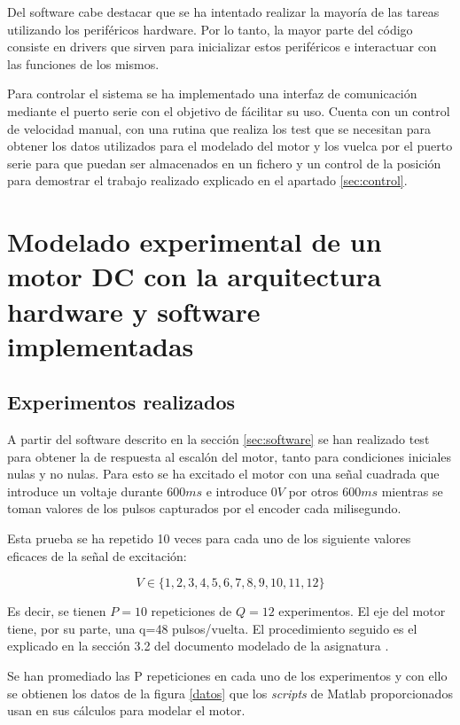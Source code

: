 \documentclass[a4paper]{article}
\begin{document}
Del software cabe destacar que se ha intentado realizar la mayoría de las tareas utilizando los periféricos hardware. Por lo tanto,
la mayor parte del código consiste en drivers que sirven para inicializar estos periféricos e interactuar con las funciones de los mismos.

Para controlar el sistema se ha implementado una interfaz de comunicación mediante el puerto serie con el objetivo de fácilitar su uso.
Cuenta con un control de velocidad manual, con una rutina que realiza los test que se necesitan para obtener los datos utilizados para el modelado del motor y los vuelca
por el puerto serie para que puedan ser almacenados en un fichero y un control de la posición para demostrar el trabajo realizado explicado en el apartado \ref{sec:control}.

\section{Modelado experimental de un motor DC con la arquitectura hardware y software implementadas}
\subsection{Experimentos realizados \label{sec:exp}}
A partir del software descrito en la sección \ref{sec:software} se han realizado test para obtener la de respuesta al escalón del motor,
tanto para condiciones iniciales nulas y no nulas.
Para esto se ha excitado el motor con una señal cuadrada que introduce un voltaje durante $600ms$ e introduce $0V$ por otros $600ms$
mientras se toman valores de los pulsos capturados por el encoder cada milisegundo.

Esta prueba se ha repetido 10 veces para cada uno de los siguiente valores eficaces de la señal de excitación:

\begin{displaymath}
V \in \{1,2,3,4,5,6,7,8,9,10,11,12\}
\end{displaymath}

Es decir, se tienen $P=10$ repeticiones de $Q=12$ experimentos. El eje del motor tiene, por su parte, una q=48 pulsos/vuelta.
El procedimiento seguido es el explicado en la sección 3.2 del documento modelado de la asignatura \cite{modelado}.

Se han promediado las P repeticiones en cada uno de los experimentos y con ello se obtienen los datos de la figura \ref{datos} que los \emph{scripts}
de Matlab proporcionados usan en sus cálculos para modelar el motor.
\end{document}
